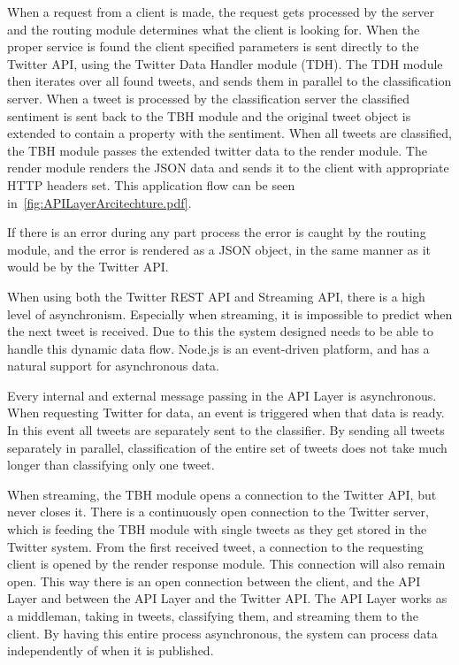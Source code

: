When a request from a client is made, the request gets processed by the server and the routing module determines what the client is looking for. When the proper service is found the client specified parameters is sent directly to the Twitter API, using the Twitter Data Handler module (TDH). The TDH module then iterates over all found tweets, and sends them in parallel to the classification server. When a tweet is processed by the classification server the classified sentiment is sent back to the TBH module and the original tweet object is extended to contain a property with the sentiment. When all tweets are classified, the TBH module passes the extended twitter data to the render module. The render module renders the JSON data and sends it to the client with appropriate HTTP headers set. This application flow can be seen in~\autoref{fig:APILayerArcitechture.pdf}.

If there is an error during any part process the error is caught by the routing module, and the error is rendered as a JSON object, in the same manner as it would be by the Twitter API. 

When using both the Twitter REST API and Streaming API, there is a high level of asynchronism. Especially when streaming, it is impossible to predict when the next tweet is received. Due to this the system designed needs to be able to handle this dynamic data flow. Node.js is an event-driven platform, and has a natural support for asynchronous data. 

Every internal and external message passing in the API Layer is asynchronous. When requesting Twitter for data, an event is triggered when that data is ready. In this event all tweets are separately sent to the classifier. By sending all tweets separately in parallel, classification of the entire set of tweets does not take much longer than classifying only one tweet. 

When streaming, the TBH module opens a connection to the Twitter API, but never closes it. There is a continuously open connection to the Twitter server, which is feeding the TBH module with single tweets as they get stored in the Twitter system. From the first received tweet, a connection to the requesting client is opened by the render response module. This connection will also remain open. This way there is an open connection between the client, and the API Layer and between the API Layer and the Twitter API. The API Layer works as a middleman, taking in tweets, classifying them, and streaming them to the client. By having this entire process asynchronous, the system can process data independently of when it is published.


